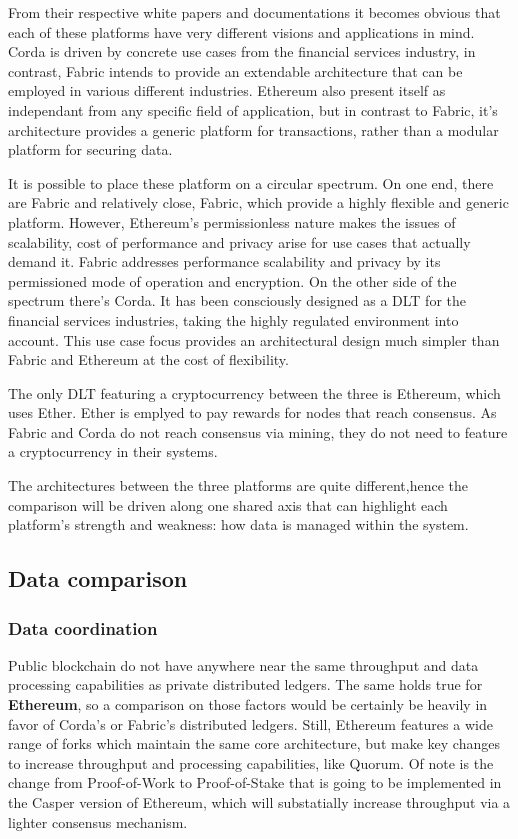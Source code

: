 From their respective white papers and documentations it becomes obvious that each of these platforms have very different visions and applications in mind.
Corda is driven by concrete use cases from the financial services industry, in contrast, Fabric intends to provide an extendable architecture that can be employed in various different industries. Ethereum also present itself as independant from any specific field of application, but in contrast to Fabric, it's architecture provides a generic platform for transactions, rather than a modular platform for securing data.

It is possible to place these platform on a circular spectrum. On one end, there are Fabric and relatively close, Fabric, which provide a highly flexible and generic platform. However, Ethereum's permissionless nature makes the issues of scalability, cost of performance and privacy arise for use cases that actually demand it. Fabric addresses performance scalability and privacy by its permissioned mode of operation and encryption.
On the other side of the spectrum there's Corda. It has been consciously designed as a DLT for the financial services industries, taking the highly regulated environment into account.
This use case focus provides an architectural design much simpler than Fabric and Ethereum at the cost of flexibility.

The only DLT featuring a cryptocurrency between the three is Ethereum, which uses Ether. Ether is emplyed to pay rewards for nodes that reach consensus. As Fabric and Corda do not reach consensus via mining, they do not need to feature a cryptocurrency in their systems.


The architectures between the three platforms are quite different,hence the comparison will be driven along one shared axis that can highlight each platform's strength and weakness: how data is managed within the system. 

\subsection{Data comparison}

\subsubsection{Data coordination}

Public blockchain do not have anywhere near the same throughput and data processing capabilities as private distributed ledgers. The same holds true for \textbf{Ethereum}, so a comparison on those factors would be certainly be heavily in favor of Corda's or Fabric's distributed ledgers.
Still, Ethereum features a wide range of forks which maintain the same core architecture, but make key changes to increase throughput and processing capabilities, like Quorum. Of note is the change from Proof-of-Work to Proof-of-Stake that is going to be implemented in the Casper version of Ethereum, which will substatially increase throughput via a lighter consensus mechanism.\\


